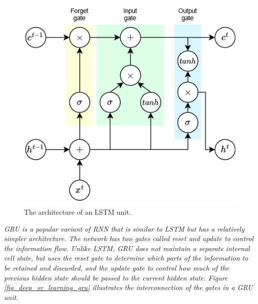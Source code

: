 \documentclass[preprint,12pt]{elsarticle}
\begin{document}
\begin{figure}[h!]
    \centering
    \includegraphics[scale=0.5]{fig_deep_sv_learning_lstm.png}
    \caption{The architecture of an LSTM unit.}
    \label{fig_deep_sv_learning_lstm}
\end{figure}

\emph{GRU is a popular variant of RNN that is similar to LSTM but has a relatively simpler architecture. The network has two gates called reset and update to control the information flow. Unlike LSTM, GRU does not maintain a separate internal cell state, but uses the reset gate to determine which parts of the information to be retained and discarded, and the update gate to control how much of the previous hidden state should be passed to the current hidden state. Figure \ref{fig_deep_sv_learning_gru} illustrates the interconnection of the gates in a GRU unit.}
\end{document}
